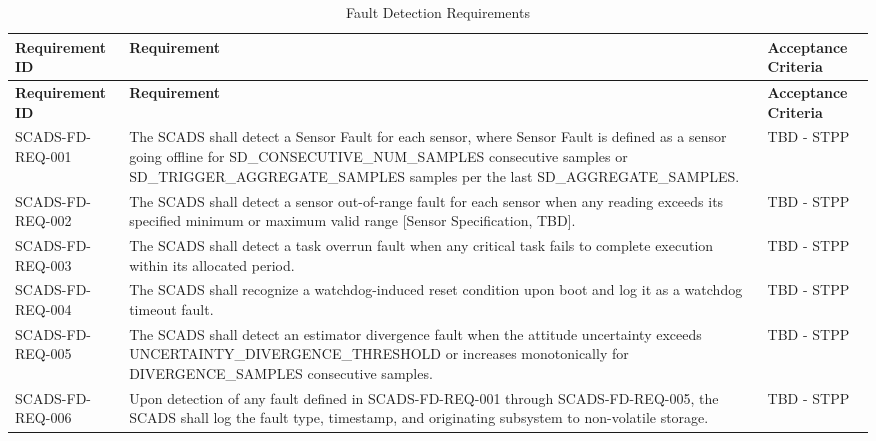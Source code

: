 \documentclass{article}
\begin{document}
            \renewcommand{\arraystretch}{1.4}
            \begin{longtable}{|l|p{9cm}|p{5cm}|}
                \caption{Fault Detection Requirements} \\
                \hline
                \textbf{Requirement ID} & \textbf{Requirement} & 
                    \textbf{Acceptance Criteria} \\ \hline
                \endfirsthead

                \hline
                \textbf{Requirement ID} & \textbf{Requirement} & 
                    \textbf{Acceptance Criteria} \\ \hline
                \endhead
                \hline
                \endfoot
                SCADS-FD-REQ-001 & The SCADS shall detect a Sensor Fault for each 
                                 sensor, where Sensor Fault is defined as a sensor 
                                 going offline for SD\_CONSECUTIVE\_NUM\_SAMPLES 
                                 consecutive samples or 
                                 SD\_TRIGGER\_AGGREGATE\_SAMPLES samples per the 
                                 last SD\_AGGREGATE\_SAMPLES. 
                               & TBD - STPP \\ \hline
                SCADS-FD-REQ-002 & The SCADS shall detect a sensor out-of-range fault 
                                 for each sensor when any reading exceeds its 
                                specified minimum or maximum valid range 
                                [Sensor Specification, TBD]. 
                               & TBD - STPP \\ \hline
                SCADS-FD-REQ-003 & The SCADS shall detect a task overrun fault when 
                                 any critical task fails to complete execution 
                                 within its allocated period.
                               & TBD - STPP \\ \hline
                SCADS-FD-REQ-004 & The SCADS shall recognize a watchdog-induced reset 
                                 condition upon boot and log it as a watchdog 
                                 timeout fault.
                               & TBD - STPP \\ \hline
                SCADS-FD-REQ-005 & The SCADS shall detect an estimator divergence 
                                 fault when the attitude uncertainty exceeds 
                                 UNCERTAINTY\_DIVERGENCE\_THRESHOLD or increases 
                                 monotonically for DIVERGENCE\_SAMPLES consecutive 
                                 samples.
                               & TBD - STPP \\ \hline
                SCADS-FD-REQ-006 & Upon detection of any fault defined in 
                                 SCADS-FD-REQ-001 through SCADS-FD-REQ-005, 
                                 the SCADS shall log the fault type, timestamp, 
                                 and originating subsystem to non-volatile storage.
                               & TBD - STPP \\ \hline
            \end{longtable}
\end{document}
